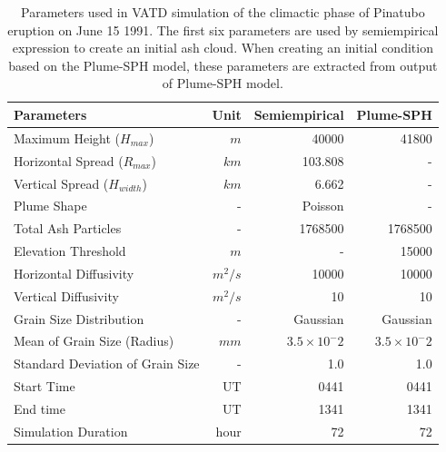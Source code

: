 \documentclass[utf8]{frontiersSCNS} %
\begin{document}
\begin{table}[htp]
\centering
\caption{Parameters used in VATD simulation of the climactic phase of Pinatubo eruption on June 15 1991. The first six parameters are used by semiempirical expression to create an initial ash cloud. When creating an initial condition based on the Plume-SPH model, these parameters are extracted from output of Plume-SPH model.}
	 \begin{tabular}{lrrr}
	 \hline
	 Parameters & Unit & Semiempirical & Plume-SPH \\
	 \hline
	 Maximum Height ($H_{max}$) & $m$ & 40000 & 41800 \\
	 Horizontal Spread ($R_{max}$) & $km$ & 103.808 & -\\
	 Vertical Spread ($H_{width}$) & $km$ & 6.662 & - \\
	 Plume Shape & - & Poisson & - \\
	 Total Ash Particles & - & 1768500 & 1768500 \\
	 Elevation Threshold & $m$ & - & 15000 \\
	 Horizontal Diffusivity & $m^2/s$ &10000 & 10000\\
	 Vertical Diffusivity & $m^2/s$ & 10 & 10 \\
	 Grain Size Distribution & - & Gaussian & Gaussian \\
	 Mean of Grain Size (Radius) & $mm$ & $3.5 \times 10 ^-2$ & $3.5 \times 10 ^-2$ \\
	 Standard Deviation of Grain Size & - & 1.0 & 1.0 \\
	 	Start Time & UT & 0441 & 0441 \\
	 End time & UT & 1341 & 1341 \\
	 Simulation Duration & hour & 72 & 72 \\
	 \hline
	 \end{tabular}
	 \label{tab:input_parameter_Puff_simulation}
\end{table}
\end{document}
